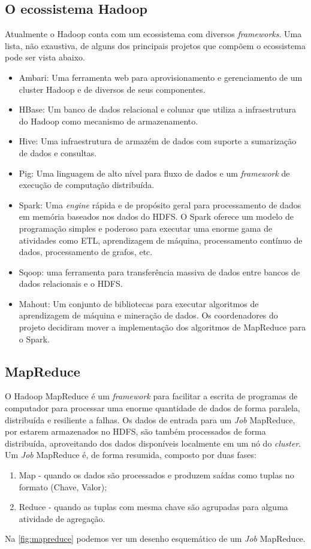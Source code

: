 \subsection{O ecossistema Hadoop}
Atualmente o Hadoop conta com um ecossistema com diversos \textit{frameworks}. Uma lista, não exaustiva, de alguns dos principais projetos que compõem o ecossistema pode ser vista abaixo.
\begin{itemize}
	\item Ambari: Uma ferramenta web para aprovisionamento e gerenciamento de um cluster Hadoop e de diversos de seus componentes.
	\item HBase: Um banco de dados relacional e colunar que utiliza a infraestrutura do Hadoop como mecanismo de armazenamento.
	\item Hive: Uma infraestrutura de armazém de dados com suporte a sumarização de dados e consultas.
	\item Pig: Uma linguagem de alto nível para fluxo de dados e um \textit{framework} de execução de computação distribuída. 
	\item Spark: Uma \textit{engine} rápida e de propósito geral para processamento de dados em memória baseados nos dados do HDFS. O Spark oferece um modelo de programação simples e poderoso para executar uma enorme gama de atividades como ETL, aprendizagem de máquina, processamento contínuo de dados, processamento de grafos, etc.
	\item Sqoop: uma ferramenta para transferência massiva de dados entre bancos de dados relacionais e o HDFS.
	\item Mahout: Um conjunto de bibliotecas para executar algoritmos de aprendizagem de máquina e mineração de dados. Os coordenadores do projeto decidiram mover a implementação dos algoritmos de MapReduce para o Spark.
\end{itemize}

\subsection{MapReduce}
O Hadoop MapReduce é um \textit{framework} para facilitar a escrita de programas de computador para processar uma enorme quantidade de dados de forma paralela, distribuída e resiliente a falhas. Os dados de entrada para um \textit{Job} MapReduce, por estarem armazenados no HDFS, são também processados de forma distribuída, aproveitando dos dados disponíveis localmente em um nó do \textit{cluster}. Um \textit{Job} MapReduce é, de forma resumida, composto por duas fases:
\begin{enumerate}
	\item Map - quando os dados são processados e produzem saídas como tuplas no formato (Chave, Valor); 
	\item Reduce - quando as tuplas com mesma chave são agrupadas para alguma atividade de agregação.  
\end{enumerate}
Na \ref{fig:mapreduce} podemos ver um desenho esquemático de um \textit{Job} MapReduce.


